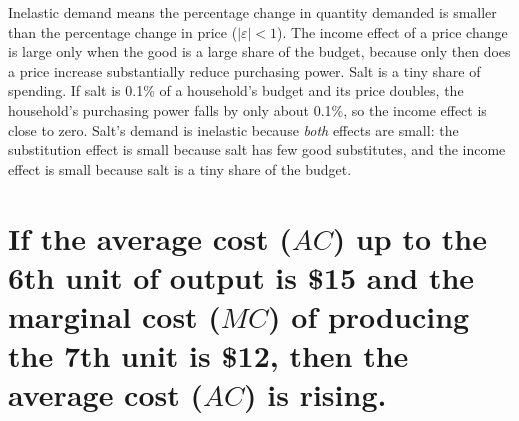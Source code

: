 \documentclass[11pt, a4]{exam}
\begin{document}
\begin{questions}
\begin{parts}
\begin{solution}[1in]
Inelastic demand means the percentage change in quantity demanded is smaller than the percentage change in price ($|\varepsilon| < 1$). The income effect of a price change is large only when the good is a large share of the budget, because only then does a price increase substantially reduce purchasing power. Salt is a tiny share of spending. If salt is 0.1\% of a household's budget and its price doubles, the household's purchasing power falls by only about 0.1\%, so the income effect is close to zero. Salt's demand is inelastic because \emph{both} effects are small: the substitution effect is small because salt has few good substitutes, and the income effect is small because salt is a tiny share of the budget.
\end{solution}





\bigskip

\bigskip

\bigskip

\bigskip

\bigskip

\bigskip

\bigskip

\bigskip

\bigskip

\bigskip

\bigskip

\bigskip

\bigskip

\bigskip

\bigskip

\bigskip

\bigskip

\bigskip

\part[5] {If the average cost ($AC$) up to the 6th unit of output is \$15 and the marginal cost ($MC$) of producing the 7th unit is \$12, then the average cost ($AC$) is rising.}  \answerline[False]




\bigskip



\end{parts}
\end{questions}
\end{document}
